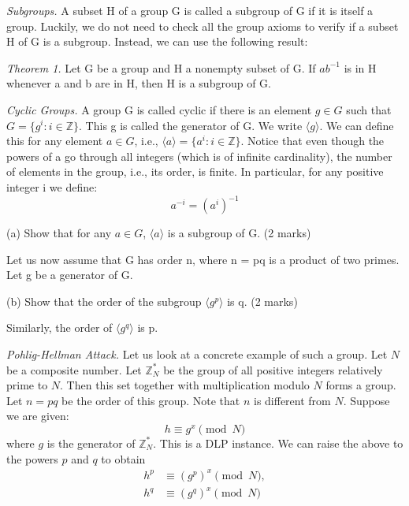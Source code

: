 \documentclass{article}
\begin{document}
\textit{Subgroups.} A subset H of a group G is called a subgroup of G if it is itself a group. Luckily, we do not need to check all the group axioms to verify if a subset H of G is a subgroup. Instead, we can use the following result:


\textit{Theorem 1.} Let G be a group and H a nonempty subset of G. If $ab^{-1}$ is in H whenever a and b are in H, then H is a subgroup of G.


\textit{Cyclic Groups.} A group G is called cyclic if there is an element $g \in G$ such that $G = \{g^{i} : i \in \mathbb{Z}\}$. This g is called the generator of G. We write $\langle g \rangle$. We can define this for any element $a \in G$, i.e., $\langle a \rangle = \{a^{i} : i \in \mathbb{Z}\}$. Notice that even though the powers of a go through all integers (which is of infinite cardinality), the number of elements in the group, i.e., its order, is finite. In particular, for any positive integer i we define: 
\begin{equation*}
    a^{-i} = (a^{i})^{-1}
\end{equation*}

(a) Show that for any $a \in G$, $\langle a \rangle$ is a subgroup of G. (2 marks)

Let us now assume that G has order n, where n = pq is a product of two primes. Let g be a generator of G. 

(b) Show that the order of the subgroup $\langle g^{p} \rangle$ is q. (2 marks)

Similarly, the order of $\langle g^{q} \rangle$ is p.

\textit{Pohlig-Hellman Attack.} Let us look at a concrete example of such a group. Let $N$ be a composite number. Let $\mathbb{Z}_{N}^{*}$ be the group of all positive integers relatively prime to $N$. Then this set together with multiplication modulo $N$ forms a group. Let $n = pq$ be the order of this group. Note that $n$ is different from $N$. Suppose we are given: 
\begin{equation*}
    h \equiv g^x \pmod{N}
\end{equation*}
where $g$ is the generator of
$\mathbb{Z}_{N}^{*}$. This is a DLP instance. We can raise the above to the powers $p$ and $q$ to obtain 
\begin{equation}
\begin{aligned}
h^p &\equiv (g^p)^x \pmod{N}, \\
h^q &\equiv (g^q)^x \pmod{N}
\end{aligned}
\end{equation}
\end{document}
